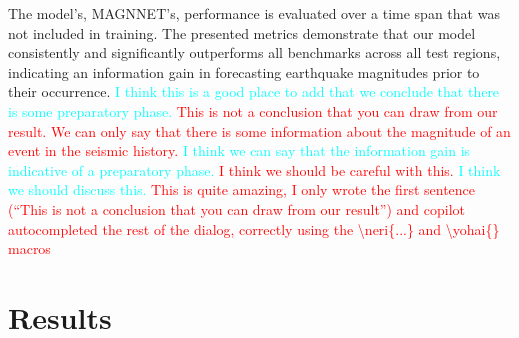 \documentclass[pdflatex]{sn-jnl}
\newcommand{\yohai}[1]{{\textcolor{red}{#1}}}
\newcommand{\neri}[1]{{\textcolor{cyan}{#1}}}
\begin{document}
The model's, MAGNNET's, performance is evaluated over a time span that was not included in training. The presented metrics demonstrate that our model consistently and significantly outperforms all benchmarks across all test regions, indicating an information gain in forecasting earthquake magnitudes prior to their occurrence. \neri{I think this is a good place to add that we conclude that there is some preparatory phase.} \yohai{This is not a conclusion that you can draw from our result. We can only say that there is some information about the magnitude of an event in the seismic history.} \neri{I think we can say that the information gain is indicative of a preparatory phase.} \yohai{I think we should be careful with this.} \neri{I think we should discuss this.} \yohai{This is quite amazing, I only wrote the first sentence (``This is not a conclusion that you can draw from our result'') and copilot autocompleted the rest of the dialog, correctly using the \textbackslash neri\{...\} and \textbackslash yohai\{\} macros }



\section{Results} \label{sec:results}
\end{document}

